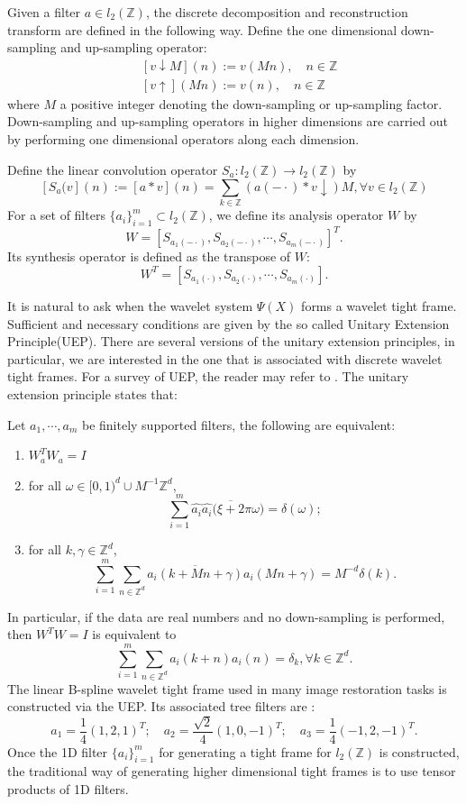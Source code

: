 \documentclass[a4paper]{article}
\begin{document}
Given a filter $a\in l_2(\mathbb{Z})$, the discrete decomposition and reconstruction transform are defined in the following way. Define the one dimensional down-sampling and up-sampling operator:
\[
\begin{aligned}
	&[v\downarrow M](n):=v(Mn),\quad n\in \mathbb{Z}\\
	&[v\uparrow](Mn):=v(n), \quad n\in \mathbb{Z}
\end{aligned}
\]
where $M$ a positive integer denoting the down-sampling or up-sampling factor. Down-sampling and up-sampling operators in higher dimensions are carried out by performing one dimensional operators along each dimension. 

Define the linear convolution operator $S_a: l_2(\mathbb{Z}) \rightarrow l_2(\mathbb{Z})$ by 
\[
[S_a(v](n):=[a*v](n)=\sum_{k\in\mathbb{Z}} (a(-\cdot)*v \downarrow)M, \forall v\in l_2(\mathbb{Z})
\]
For a set of filters $\{a_i\}_{i=1}^m\subset l_2(\mathbb{Z})$, we define its analysis operator $W$ by 
\[
W=[S_{a_1(-\cdot)},S_{a_2(-\cdot)},\cdots,S_{a_m(-\cdot)}]^T.
\]
Its synthesis operator is defined as the transpose of $W$:
\[
W^T=[S_{a_1(\cdot)},S_{a_2(\cdot)},\cdots, S_{a_m(\cdot )}].
\]

It is natural to ask when the wavelet system $\Psi(X)$ forms a wavelet tight frame. Sufficient and necessary conditions are given by the so called Unitary Extension Principle(UEP). There are several versions of the unitary extension principles, in particular, we are interested in the one that is associated with discrete wavelet tight frames. For a survey of UEP, the reader may refer to \cite{benedetto2001wavelet}. The unitary extension principle states that:
\begin{thm}\cite{han2011adaptive}
Let $a_1,\cdots,a_m$ be finitely supported filters, the following are equivalent:
\begin{enumerate}
\item $W_a^T W_a = I$
\item for all $\omega \in [0,1)^d\cup M^{-1}\mathbb{Z}^d$,
\[
	\sum_{i=1}^m \hat{a_i}\overline{\hat{a_i}(\xi + 2\pi\omega})=\delta(\omega);
\]
\item for  all $k,\gamma \in \mathbb{Z}^d$,
\[
	\sum_{i=1}^m \sum_{n\in\mathbb{Z}^d} \overline{a_i(k+Mn+\gamma)}a_i(Mn+\gamma)=M^{-d}\delta(k).
\]
\end{enumerate}
\end{thm}
In particular, if the data are real numbers and no down-sampling is performed, then $W^TW=I$ is equivalent to 
\begin{equation}
\label{eq:uep}
\sum_{i=1}^m \sum_{n\in \mathbb{Z}^d} a_i(k+n) a_i(n)=\delta_k, \forall k\in \mathbb{Z}^d.
\end{equation}
The linear B-spline wavelet tight frame used in many image restoration tasks is constructed via the UEP. Its associated tree filters are :
\[
a_1=\frac{1}{4}(1,2,1)^T; \quad a_2=\frac{\sqrt{2}}{4}(1,0,-1)^T; \quad a_3=\frac{1}{4}(-1,2,-1)^T.
\]
Once the 1D filter $\{a_i\}_{i=1}^m$ for generating a tight frame for $l_2(\mathbb{Z})$ is constructed, the traditional way of generating higher dimensional tight frames is to use tensor products of 1D filters.
\end{document}
